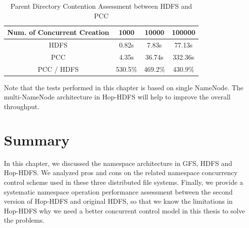 \begin{table}[h]
	\centering
	\begin{tabular}{|c|c|c|c|}
		\hline
		\textbf{Num. of Concurrent Creation} & \textbf{1000} & \textbf{10000} & \textbf{100000} \\ \hline
		HDFS                                 & 0.82s         & 7.83s          & 77.13s          \\ \hline
		PCC                       & 4.35s         & 36.74s         & 332.36s         \\ \hline
		PCC / HDFS                           & 530.5\%       & 469.2\%        & 430.9\%         \\ \hline
	\end{tabular}
		\caption{Parent Directory Contention Assessment between HDFS and PCC}
		\label{table:hdfsPCCparent}
\end{table}

\noindent Note that the tests performed in this chapter is based on single NameNode. The multi-NameNode architecture in Hop-HDFS will help to improve the overall throughput.

\section*{Summary}
In this chapter, we discussed  the namespace architecture in GFS, HDFS and Hop-HDFS. We analyzed pros and cons on the related namespace concurrency control scheme used in these three distributed file systems. Finally, we provide a systematic namespace operation performance assessment between the second version of Hop-HDFS and original HDFS, so that we know the limitations in Hop-HDFS why we need a better concurrent control model in this thesis to solve the problems.